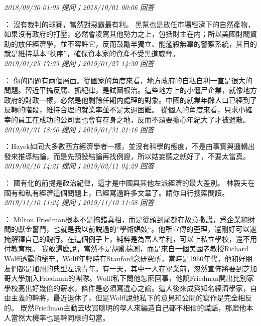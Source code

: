 \documentclass[twocolumn]{ctexart}
\begin{document}
\textit{\hfill\noindent\small 2018/09/30 01:03 提问；2018/10/01 00:06 回答}

：
沒有裁判的球賽，當然對惡霸最有利。
黑幫也是放任市場經濟下的自然產物，如果沒有政府的打壓，必然會凌駕其他勢力之上，包括財主在内；所以美國財閥資助的放任經濟學，並不容許它，反而鼓勵半獨立、能濫殺無辜的警察系統，其目的就是維持基本“秩序”，確保資本家的資產不受黑道威脅。
\\

\textit{\hfill\noindent\small 2019/01/25 17:33 提问；2019/01/27 14:30 回答}

：
你的問題有兩個層面。從國家的角度來看，地方政府的自私自利一直是很大的問題。習近平搞反腐、抓紀律，是試圖根治。這些地方上的小僵尸企業，就像地方政府的財政一樣，必然是他剩餘任期内處理的對象。中國的就業年齡人口已經到了反轉的階段，維持合理的就業率並不是太過困難。
從個人的角度來看，只求小確幸的員工在成功的公司裏也會有存身之地，反而不須要擔心年紀大了才被遣散。
\\

\textit{\hfill\noindent\small 2019/01/31 18:50 提问；2019/01/31 21:16 回答}

：Hayek如同大多數西方經濟學者一樣，並沒有科學的態度，不是由事實與邏輯出發來推導結論，而是先預設結論再找例證，所以姑妄聽之就好了，不要太當真。
\\

\textit{\hfill\noindent\small 2019/02/10 14:21 提问；2019/02/11 04:29 回答}

：
國有化的前提是政治紀律，這才是中國與其他左派經濟的最大差別。
林毅夫在國有和私有經濟這個問題上，已經寫過許多文章了。請你自行搜索閲讀。
\\

\textit{\hfill\noindent\small 2019/11/10 11:24 提问；2019/11/10 11:58 回答}

：
Milton Friedman根本不是搞錯真相，而是從頭到尾都在故意撒謊，爲企業和財閥的獻金奮鬥，也就是我以前説過的”學術娼妓“。他所宣傳的歪理，還剛好可以遮掩解釋自己的醜行。在這個例子上，純粹是為富人牟利，可以上私立學校，還不用付教育稅。 
我敢這麽說，當然不是胡亂揣測，而是來自一個美國老教授Richard Wolff透露的秘辛。Wolff年輕時在Stanford念研究所，當時是1960年代，他和好朋友們都是加州的典型左派青年。有一天，其中一人在畢業前，忽然宣佈將要到芝加哥大學加入Friedman的團隊。Wolff私下問他怎麽回事，他說Friedman開出比別家學校高出好幾倍的薪水，條件是必須寫違心之論。這人後來成爲知名經濟學家，自由主義的幹將，最近退休了，但是Wolff說他私下的意見和公開的寫作是完全相反的。 
既然Friedman主動去收買聰明的學人來編造自己都不相信的謊話，那麽他本人當然大機率也是幹同樣的勾當。
\\
\end{document}
